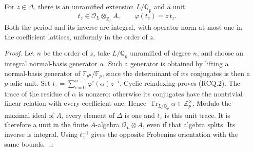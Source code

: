 \begin{lemma}
\label{AC-K33-ray-period}
For \(z\in\Delta\), there is an unramified extension \(L/\mathbb Q_p\)
and a unit
\[
 t_z\in\mathcal O_L\otimes_{\mathbb Z_p}A,\qquad
 \varphi(t_z)=z\,t_z.
 \tag{RCQ.2}
\]
Both the period and its inverse are integral, with operator norm at
most one in the coefficient lattices, uniformly in the order of \(z\).
\end{lemma}
\begin{proof}
Let \(n\) be the order of \(z\), take \(L/\mathbb Q_p\) unramified of
degree \(n\), and choose an integral normal-basis generator \(\alpha\).
Such a generator is obtained by lifting a normal-basis generator of
\(\mathbb F_{p^n}/\mathbb F_p\), since the determinant of its conjugates
is then a \(p\)-adic unit. Set
\(t_z=\sum_{i=0}^{n-1}\varphi^i(\alpha)z^{-i}\).
Cyclic reindexing proves (RCQ.2). The trace of the residue of \(\alpha\)
is nonzero: otherwise its conjugates have the nontrivial linear
relation with every coefficient one. Hence
\(\operatorname{Tr}_{L/\mathbb Q_p}\alpha\in\mathbb Z_p^\times\).
Modulo the maximal ideal of \(A\), every element of \(\Delta\) is one
and \(t_z\) is this unit trace. It is therefore a unit in the finite
\(A\)-algebra \(\mathcal O_L\otimes A\), even if that algebra splits.
Its inverse is integral. Using \(t_z^{-1}\) gives the opposite
Frobenius orientation with the same bounds.
\end{proof}

